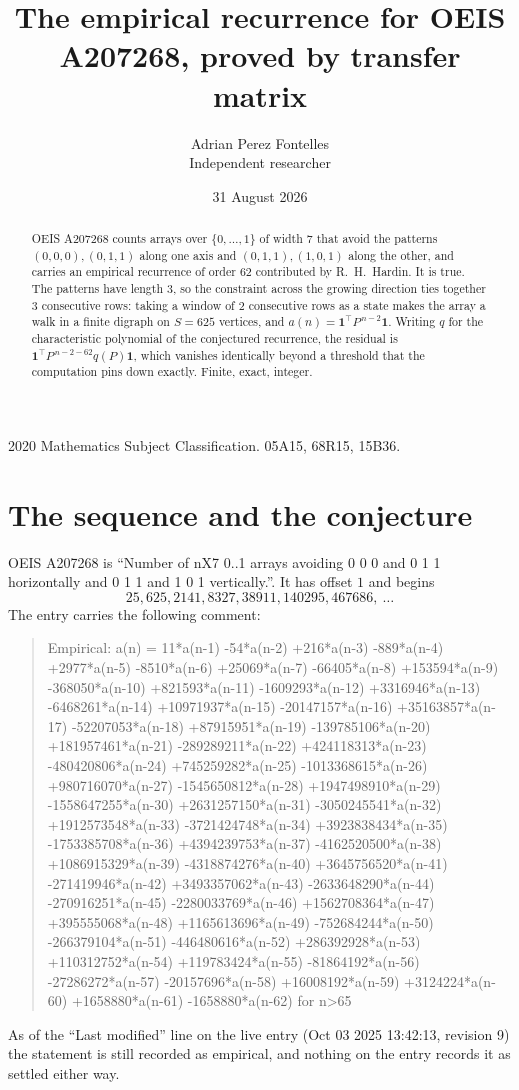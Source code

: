 \documentclass[11pt,a4paper]{article}
\title{The empirical recurrence for OEIS A207268, proved by transfer matrix}
\author{Adrian Perez Fontelles\\ \small Independent researcher}
\date{31 August 2026}
\theoremstyle{plain}
\theoremstyle{definition}
\begin{document}
\maketitle

\begin{abstract}
OEIS A207268 counts arrays over $\{0,\dots,1\}$ of width $7$ that avoid the patterns
$(0,0,0), (0,1,1)$ along one axis and $(0,1,1), (1,0,1)$ along the other, and carries an empirical recurrence of
order $62$ contributed by R.~H.~Hardin. It is true. The patterns have length $3$, so
the constraint across the growing direction ties together $3$ consecutive rows: taking a
window of $2$ consecutive rows as a state makes the array a walk in a finite digraph
on $S=625$ vertices, and $a(n)=\mathbf{1}^{\!\top}P^{\,n-2}\mathbf{1}$. Writing $q$
for the characteristic polynomial of the conjectured recurrence, the residual is
$\mathbf{1}^{\!\top}P^{\,n-2-62}q(P)\mathbf{1}$, which vanishes identically
beyond a threshold that the computation pins down exactly. Finite, exact, integer.
\end{abstract}

\noindent\small 2020 Mathematics Subject Classification. 05A15, 68R15, 15B36.\normalsize

\section{The sequence and the conjecture}

OEIS A207268 is ``Number of nX7 0..1 arrays avoiding 0 0 0 and 0 1 1 horizontally and 0 1 1 and 1 0 1 vertically.''. It has offset
$1$ and begins
\[
25, 625, 2141, 8327, 38911, 140295, 467686,\ \dots
\]
The entry carries the following comment:
\begin{quote}\small
Empirical: a(n) = 11*a(n-1) -54*a(n-2) +216*a(n-3) -889*a(n-4) +2977*a(n-5) -8510*a(n-6) +25069*a(n-7) -66405*a(n-8) +153594*a(n-9) -368050*a(n-10) +821593*a(n-11) -1609293*a(n-12) +3316946*a(n-13) -6468261*a(n-14) +10971937*a(n-15) -20147157*a(n-16) +35163857*a(n-17) -52207053*a(n-18) +87915951*a(n-19) -139785106*a(n-20) +181957461*a(n-21) -289289211*a(n-22) +424118313*a(n-23) -480420806*a(n-24) +745259282*a(n-25) -1013368615*a(n-26) +980716070*a(n-27) -1545650812*a(n-28) +1947498910*a(n-29) -1558647255*a(n-30) +2631257150*a(n-31) -3050245541*a(n-32) +1912573548*a(n-33) -3721424748*a(n-34) +3923838434*a(n-35) -1753385708*a(n-36) +4394239753*a(n-37) -4162520500*a(n-38) +1086915329*a(n-39) -4318874276*a(n-40) +3645756520*a(n-41) -271419946*a(n-42) +3493357062*a(n-43) -2633648290*a(n-44) -270916251*a(n-45) -2280033769*a(n-46) +1562708364*a(n-47) +395555068*a(n-48) +1165613696*a(n-49) -752684244*a(n-50) -266379104*a(n-51) -446480616*a(n-52) +286392928*a(n-53) +110312752*a(n-54) +119783424*a(n-55) -81864192*a(n-56) -27286272*a(n-57) -20157696*a(n-58) +16008192*a(n-59) +3124224*a(n-60) +1658880*a(n-61) -1658880*a(n-62) for n>65
\end{quote}
As of the ``Last modified'' line on the live entry (Oct 03 2025 13:42:13, revision
9) the statement is still recorded as empirical, and nothing on the entry
records it as settled either way.
\end{document}
